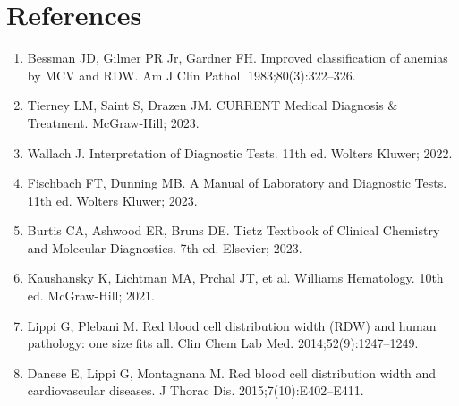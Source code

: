 \section*{References}
\begin{enumerate}
  \item Bessman JD, Gilmer PR Jr, Gardner FH. Improved classification of anemias by MCV and RDW. Am J Clin Pathol. 1983;80(3):322--326.
  \item Tierney LM, Saint S, Drazen JM. CURRENT Medical Diagnosis \& Treatment. McGraw-Hill; 2023.
  \item Wallach J. Interpretation of Diagnostic Tests. 11th ed. Wolters Kluwer; 2022.
  \item Fischbach FT, Dunning MB. A Manual of Laboratory and Diagnostic Tests. 11th ed. Wolters Kluwer; 2023.
  \item Burtis CA, Ashwood ER, Bruns DE. Tietz Textbook of Clinical Chemistry and Molecular Diagnostics. 7th ed. Elsevier; 2023.
  \item Kaushansky K, Lichtman MA, Prchal JT, et al. Williams Hematology. 10th ed. McGraw-Hill; 2021.
  \item Lippi G, Plebani M. Red blood cell distribution width (RDW) and human pathology: one size fits all. Clin Chem Lab Med. 2014;52(9):1247--1249.
  \item Danese E, Lippi G, Montagnana M. Red blood cell distribution width and cardiovascular diseases. J Thorac Dis. 2015;7(10):E402--E411.
\end{enumerate}

\clearpage
